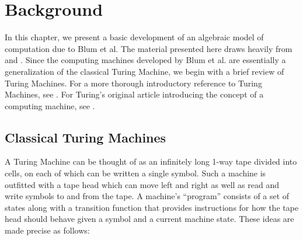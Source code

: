 \chapter{Background}

In this chapter, we present a basic development of an algebraic model
of computation due to Blum et al.  The material presented here draws
heavily from \cite{B89} and \cite{B98}.  Since the computing machines
developed by Blum et al. are essentially a generalization of the
classical Turing Machine, we begin with a brief review of Turing
Machines.  For a more thorough introductory reference to Turing
Machines, see \cite{S06}.  For Turing's original article introducing
the concept of a computing machine, see \cite{T36}.

\section{Classical Turing Machines}

A Turing Machine can be thought of as an infinitely long 1-way tape
divided into cells, on each of which can be written a single symbol.
Such a machine is outfitted with a tape head which can move left and
right as well as read and write symbols to and from the tape. A
machine's ``program'' consists of a set of states along with a
transition function that provides instructions for how the tape head
should behave given a symbol and a current machine state.  These ideas
are made precise as follows:

